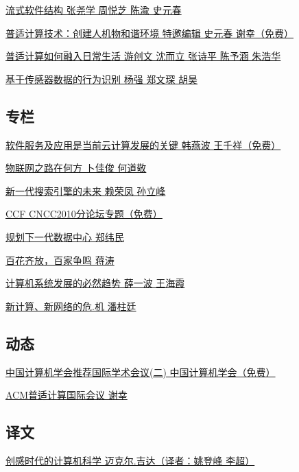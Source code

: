 \documentclass[a4paper]{article}
\begin{document}
\href{http://history.ccf.org.cn/resources/1190201776262/2010/11/17/10.pdf}{流式软件结构  张尧学 周悦芝 陈渝 史元春}

\href{http://history.ccf.org.cn/resources/1190201776262/2010/11/17/6.pdf}{普适计算技术：创建人机物和谐环境  特邀编辑 史元春 谢幸（免费）}

\href{http://history.ccf.org.cn/resources/1190201776262/2010/11/17/7.pdf}{普适计算如何融入日常生活  游创文 沈而立 张诗平 陈予涵 朱浩华}

\href{http://history.ccf.org.cn/resources/1190201776262/2010/11/17/8.pdf}{基于传感器数据的行为识别  杨强 郑文琛 胡昊}

\subsection{专栏}
\href{http://history.ccf.org.cn/resources/1190201776262/2010/11/17/12.pdf}{软件服务及应用是当前云计算发展的关键  韩燕波 王千祥（免费）}

\href{http://history.ccf.org.cn/resources/1190201776262/2010/11/17/13.pdf}{物联网之路在何方  卜佳俊 何道敬}

\href{http://history.ccf.org.cn/resources/1190201776262/2010/11/17/14.pdf}{新一代搜索引擎的未来  赖荣凤 孙立峰}

\href{http://history.ccf.org.cn/resources/1190201776262/2010/11/17/11.pdf}{CCF CNCC2010分论坛专题（免费）}

\href{http://history.ccf.org.cn/resources/1190201776262/2010/11/17/15.pdf}{规划下一代数据中心  郑纬民}

\href{http://history.ccf.org.cn/resources/1190201776262/2010/11/17/16.pdf}{百花齐放，百家争鸣  蒋涛}

\href{http://history.ccf.org.cn/resources/1190201776262/2010/11/17/17.pdf}{计算机系统发展的必然趋势  薛一波 王海霞}

\href{http://history.ccf.org.cn/resources/1190201776262/2010/11/17/18.pdf}{新计算、新网络的危.机  潘柱廷}

\subsection{动态}
\href{http://history.ccf.org.cn/resources/1190201776262/2010/11/30/23.pdf}{中国计算机学会推荐国际学术会议(二)  中国计算机学会（免费）}

\href{http://history.ccf.org.cn/resources/1190201776262/2010/11/17/19.pdf}{ACM普适计算国际会议  谢幸}

\subsection{译文}
\href{http://history.ccf.org.cn/resources/1190201776262/2010/11/17/21.pdf}{创感时代的计算机科学  迈克尔.吉达（译者：姚登峰 李超）}
\end{document}
